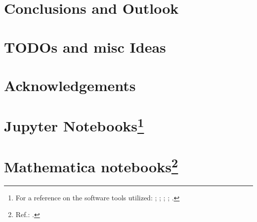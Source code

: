 \chapter{Conclusions and Outlook}\label{ch:outlook}


\iftodo
  \chapter{TODOs and misc Ideas}
  
\fi

\iftodo
  \chapter*{Acknowledgements}

  
\fi

\appendix

\chapter[Jupyter Notebooks]{Jupyter Notebooks\footnote{
  For a reference on the software tools utilized:
  \cite{comp:scipy};
  \cite{comp:sympy};
  \cite{comp:jupyter};
  \cite{comp:matplotlib};
  \cite{comp:numpy}.
}}






\chapter[Mathematica notebooks]{Mathematica notebooks\footnote{
  Ref.: \cite{Wolfram}.
}}



\printbibliography[heading=bibintoc]


